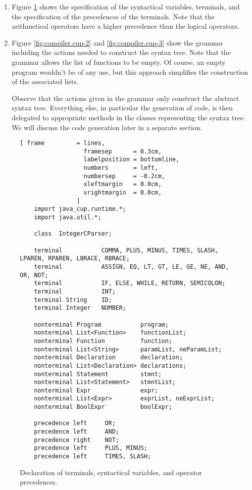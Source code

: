 \begin{enumerate}
\item Figure \ref{fig:compiler.cup-1} shows the specification of the syntactical variables,
      terminals, and the specification of the precedences of the terminals.
      Note that the arithmetical operators have a higher precedence than the logical operators.
\item Figure \ref{fig:compiler.cup-2} and \ref{fig:compiler.cup-3} show the grammar including the
      actions needed to construct the syntax tree.  Note that the grammar allows the list of
      functions to be empty.  Of course, an empty program wouldn't be of any use, but this approach
      simplifies the construction of the associated lists.

      Observe that the actions given in the grammar only construct the abstract syntax tree.
      Everything else, in particular the generation of code, is then delegated to appropriate
      methods in the classes representing the syntax tree.   We will discuss the code generation
      later in a separate section. 
\end{enumerate}



\begin{figure}[!ht]
\centering
\begin{Verbatim}[ frame         = lines, 
                  framesep      = 0.3cm, 
                  labelposition = bottomline,
                  numbers       = left,
                  numbersep     = -0.2cm,
                  xleftmargin   = 0.0cm,
                  xrightmargin  = 0.0cm,
                ]
    import java_cup.runtime.*;
    import java.util.*;
    
    class  IntegerCParser;
    
    terminal           COMMA, PLUS, MINUS, TIMES, SLASH, LPAREN, RPAREN, LBRACE, RBRACE;
    terminal           ASSIGN, EQ, LT, GT, LE, GE, NE, AND, OR, NOT;
    terminal           IF, ELSE, WHILE, RETURN, SEMICOLON; 
    terminal           INT;
    terminal String    ID;
    terminal Integer   NUMBER;
    
    nonterminal Program           program;
    nonterminal List<Function>    functionList;
    nonterminal Function          function;
    nonterminal List<String>      paramList, neParamList;
    nonterminal Declaration       declaration;
    nonterminal List<Declaration> declarations;
    nonterminal Statement         stmnt;
    nonterminal List<Statement>   stmntList;
    nonterminal Expr              expr;
    nonterminal List<Expr>        exprList, neExprList;
    nonterminal BoolExpr          boolExpr;
    
    precedence left     OR;
    precedence left     AND;
    precedence right    NOT;
    precedence left     PLUS, MINUS;
    precedence left     TIMES, SLASH;
\end{Verbatim}
\vspace*{-0.3cm}
\caption{Declaration of terminals, syntactical variables, and operator precedences.}
\label{fig:compiler.cup-1}
\end{figure}

